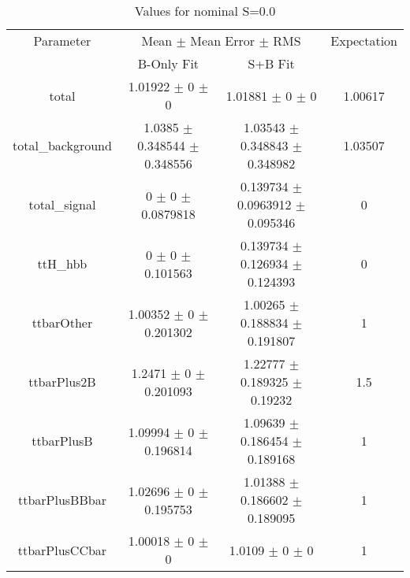 \begin{table}
\centering
\caption{Values for nominal S=0.0}
\begin{tabular}{cccc}
\toprule
Parameter & \multicolumn{2}{c}{Mean $\pm$ Mean Error $\pm$ RMS} & Expectation\\
 & B-Only Fit & S+B Fit & \\
\midrule
total & \num{1.01922} $\pm$ \num{0} $\pm$ \num{0} & \num{1.01881} $\pm$ \num{0} $\pm$ \num{0} & \num{1.00617}\\
total\_background & \num{1.0385} $\pm$ \num{0.348544} $\pm$ \num{0.348556} & \num{1.03543} $\pm$ \num{0.348843} $\pm$ \num{0.348982} & \num{1.03507}\\
total\_signal & \num{0} $\pm$ \num{0} $\pm$ \num{0.0879818} & \num{0.139734} $\pm$ \num{0.0963912} $\pm$ \num{0.095346} & \num{0}\\
ttH\_hbb & \num{0} $\pm$ \num{0} $\pm$ \num{0.101563} & \num{0.139734} $\pm$ \num{0.126934} $\pm$ \num{0.124393} & \num{0}\\
ttbarOther & \num{1.00352} $\pm$ \num{0} $\pm$ \num{0.201302} & \num{1.00265} $\pm$ \num{0.188834} $\pm$ \num{0.191807} & \num{1}\\
ttbarPlus2B & \num{1.2471} $\pm$ \num{0} $\pm$ \num{0.201093} & \num{1.22777} $\pm$ \num{0.189325} $\pm$ \num{0.19232} & \num{1.5}\\
ttbarPlusB & \num{1.09994} $\pm$ \num{0} $\pm$ \num{0.196814} & \num{1.09639} $\pm$ \num{0.186454} $\pm$ \num{0.189168} & \num{1}\\
ttbarPlusBBbar & \num{1.02696} $\pm$ \num{0} $\pm$ \num{0.195753} & \num{1.01388} $\pm$ \num{0.186602} $\pm$ \num{0.189095} & \num{1}\\
ttbarPlusCCbar & \num{1.00018} $\pm$ \num{0} $\pm$ \num{0} & \num{1.0109} $\pm$ \num{0} $\pm$ \num{0} & \num{1}\\
\bottomrule
\end{tabular}
\end{table}